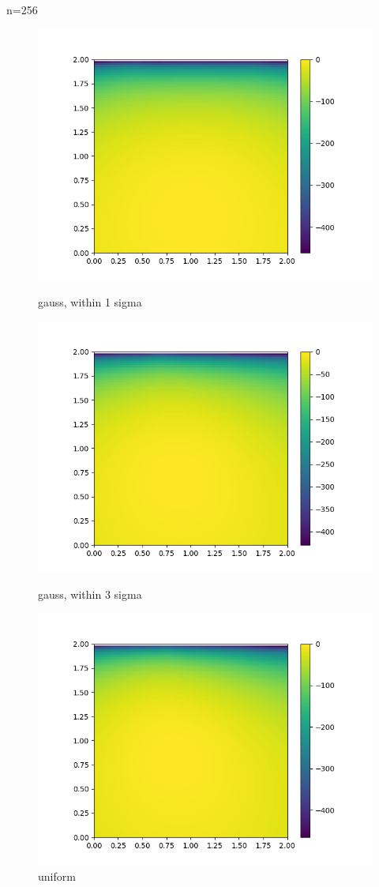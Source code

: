 \documentclass[english]{scrartcl}
\begin{document}
\par n=256
\begin{figure}[H]
	\includegraphics[width=\linewidth]{lighthouse/2d/gauss_1sigma_n=256}
	\caption{gauss, within 1 sigma}  
	\endminipage \hfill
	\includegraphics[width=\linewidth]{lighthouse/2d/gauss_3sigma_n=256}
	\caption{gauss, within 3 sigma} 
	\endminipage \hfill
	\includegraphics[width=\linewidth]{lighthouse/2d/unif_n=256}
	\caption{uniform} 
	\endminipage \hfill
\end{figure}
\end{document}

